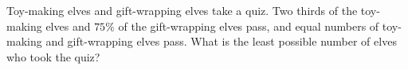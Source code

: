 Toy-making elves and gift-wrapping elves take a quiz. Two thirds of the toy-making elves and $75\%$ of the gift-wrapping elves pass, and equal numbers of toy-making and gift-wrapping elves pass. What is the least possible number of elves who took the quiz?
